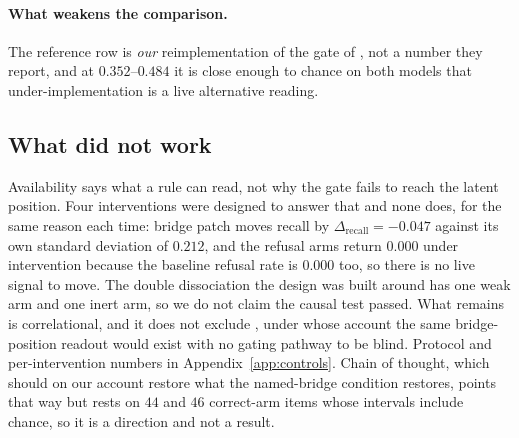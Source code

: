 \documentclass{article}
\newif\ifredflags
\newcommand{\rf}[1]{\ifredflags{\textcolor{red}{\textbf{[MISSING: #1]}}}\fi}
\newcommand{\rv}[1]{\ifredflags{\textcolor{red}{\textbf{[VERIFY: #1]}}}\fi}
\begin{document}
\paragraph{What weakens the comparison.} The reference row is \emph{our} reimplementation of the gate
of \citet{ferrando2025entity}, not a number they report, and at $0.352$--$0.484$ it is close enough to
chance on both models that under-implementation is a live alternative reading.
\rv{that reimplementation on Gemma 2 9B specifically. \citet{ferrando2025entity} report their
strongest directions on Gemma 2 2B and 9B around layer~9 and layer~10 respectively; layer 8 is this
model's own confirmed-stable positive-control layer under the corrected entity split
(Section~\ref{sec:res-e0}), not a layer chosen to match theirs. They also exclude the \emph{players}
entity type on both Gemma models because it refuses nearly all such queries, and players is the only
entity type in our two-hop set.}
\rf{DRIFT, the supervised inter-layer probe of \citet{hussain2026parallax}, which that paper names
alongside SAPLMA as the only two methods surviving its artifact controls.}
\rf{BGR on the three models with no confirmed, multi-seed-stable positive control
(Section~\ref{sec:res-e0}: Gemma 2 2B, Llama 3.1 8B, Qwen3 32B). Two of five clearing the positive
control at all, after an exhaustive per-layer and per-seed search, is itself the headline finding of
Section~\ref{sec:res-e0}, not a scale claim left to check.}
\rf{a re-run of every selector on the zero-overlap subset per model, since control (n) does not
clear on either in-scope model.}

\subsection{What did not work}
\label{sec:res-causal}
\label{sec:res-cot}

Availability says what a rule can read, not why the gate fails to reach the latent position. Four
interventions were designed to answer that and none does, for the same reason each time: bridge patch
moves recall by $\Delta_{\mathrm{recall}}=-0.047$ against its own standard deviation of $0.212$, and
the refusal arms return $0.000$ under intervention because the baseline refusal rate is $0.000$ too,
so there is no live signal to move. The double dissociation the design was built around has one weak
arm and one inert arm, so we do not claim the causal test passed. What remains is correlational, and
it does not exclude \citet{layerorder2026}, under whose account the same bridge-position readout would
exist with no gating pathway to be blind. Protocol and per-intervention numbers in
Appendix~\ref{app:controls}. Chain of thought, which should on our account restore what the
named-bridge condition restores, points that way but rests on $44$ and $46$ correct-arm items whose
intervals include chance, so it is a direction and not a result.
\end{document}
